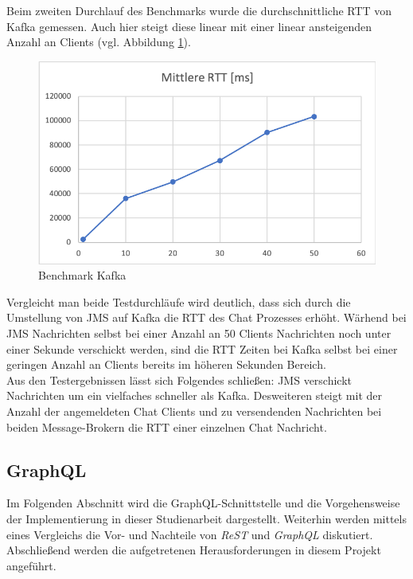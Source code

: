 \documentclass[10pt,journal,compsoc]{IEEEtran}
\begin{document}
Beim zweiten Durchlauf des Benchmarks wurde die durchschnittliche RTT von Kafka gemessen. Auch hier steigt diese linear mit einer linear ansteigenden Anzahl an Clients (vgl. Abbildung \ref{fig:RTT_Kafka}). 
\\

\begin{figure}[h]
	\centering
	\includegraphics[scale=0.5]{Bilder/RTT_Kafka.PNG}
	\caption{Benchmark Kafka}
	\label{fig:RTT_Kafka}
\end{figure}

Vergleicht man beide Testdurchläufe wird deutlich, dass sich durch die Umstellung von JMS auf Kafka die RTT des Chat Prozesses erhöht. Wärhend bei JMS Nachrichten selbst bei einer Anzahl an 50 Clients Nachrichten noch unter einer Sekunde verschickt werden, sind die RTT Zeiten bei Kafka selbst bei einer geringen Anzahl an Clients bereits im höheren Sekunden Bereich.
\\
Aus den Testergebnissen lässt sich Folgendes schließen: JMS verschickt Nachrichten um ein vielfaches schneller als Kafka. Desweiteren steigt mit der Anzahl der angemeldeten Chat Clients und zu versendenden Nachrichten bei beiden Message-Brokern die RTT einer einzelnen Chat Nachricht.



\subsection{GraphQL}
Im Folgenden Abschnitt wird die GraphQL-Schnittstelle  und die Vorgehensweise der Implementierung in dieser Studienarbeit dargestellt. Weiterhin werden mittels eines Vergleichs die Vor- und Nachteile von \textit{ReST} und \textit{GraphQL} diskutiert. Abschließend werden die aufgetretenen Herausforderungen in diesem Projekt angeführt.
\end{document}
